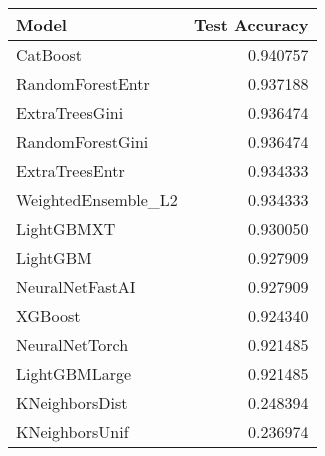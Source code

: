 \begin{tabular}{lr}
\toprule
Model & Test Accuracy \\
\midrule
CatBoost & 0.940757 \\
RandomForestEntr & 0.937188 \\
ExtraTreesGini & 0.936474 \\
RandomForestGini & 0.936474 \\
ExtraTreesEntr & 0.934333 \\
WeightedEnsemble_L2 & 0.934333 \\
LightGBMXT & 0.930050 \\
LightGBM & 0.927909 \\
NeuralNetFastAI & 0.927909 \\
XGBoost & 0.924340 \\
NeuralNetTorch & 0.921485 \\
LightGBMLarge & 0.921485 \\
KNeighborsDist & 0.248394 \\
KNeighborsUnif & 0.236974 \\
\bottomrule
\end{tabular}
